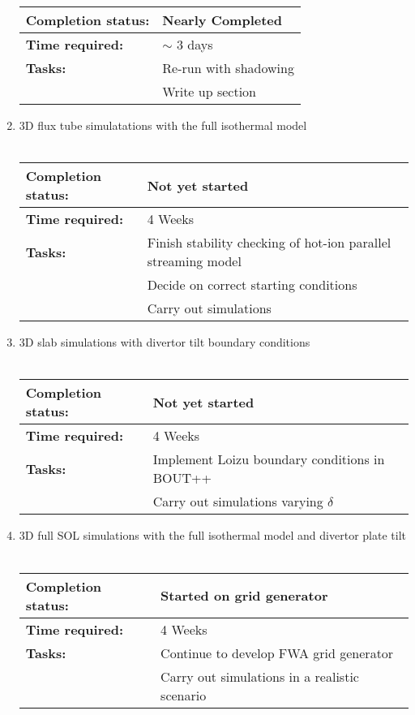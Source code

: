\documentclass[11pt]{article}
\begin{document}
\begin{enumerate}
\begin{tabular}{l l}
\hline
\textbf{Completion status:} & Nearly Completed \\
\hline
  \textbf{Time required:} & $\sim$ 3 days \\
\hline
\textbf{Tasks:} & Re-run  with shadowing\\
  &     Write up section
\end{tabular}
\item 3D flux tube simulatations with the full isothermal model\\ \\
\begin{tabular}{l l}
\hline
\textbf{Completion status:} & Not yet started \\
\hline
  \textbf{Time required:} & 4 Weeks \\
\hline
\textbf{Tasks:} & Finish stability checking of hot-ion parallel streaming model\\
 & Decide on correct starting conditions\\ 
 & Carry out simulations
\end{tabular}
\item 3D slab simulations with divertor tilt boundary conditions\\ \\
\begin{tabular}{l l}
\hline
\textbf{Completion status:} &  Not yet started \\
\hline
  \textbf{Time required:} & 4 Weeks \\
\hline
\textbf{Tasks:} & Implement Loizu boundary conditions in BOUT++\\
 & Carry out simulations varying $\delta$
\end{tabular}
\item 3D full SOL simulations with the full isothermal model and divertor plate tilt\\ \\
\begin{tabular}{l l}
\hline
\textbf{Completion status:} &  Started on grid generator \\
\hline
  \textbf{Time required:} & 4 Weeks \\
\hline
\textbf{Tasks:} & Continue to develop FWA grid generator\\
 & Carry out simulations in a realistic scenario
\end{tabular}
\end{enumerate}
\newpage
\end{document}
